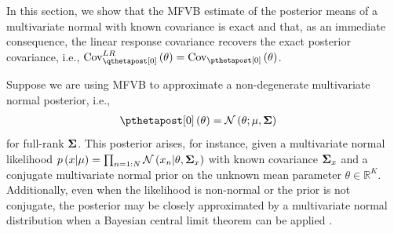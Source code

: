 \documentclass{article}\usepackage[]{graphicx}\usepackage[]{color}
\theoremstyle{definition}
\theoremstyle{plain}
\theoremstyle{plain}
\theoremstyle{plain}
\theoremstyle{definition}
\theoremstyle{plain}
\theoremstyle{plain}
\begin{document}
In this section, we show that the MFVB estimate of the posterior means
of a multivariate normal with known covariance is exact and that,
as an immediate consequence, the linear response covariance recovers
the exact posterior covariance, i.e., $\lrvbcov\left(\theta\right)=\pcov\left(\theta\right)$.

Suppose we are using MFVB to approximate a non-degenerate multivariate
normal posterior, i.e.,
\begin{align*}
\pzeropost\left(\theta\right) & =\mathcal{N}\left(\theta;\mu,\covmat\right)
\end{align*}
for full-rank $\boldsymbol{\Sigma}$. This posterior arises, for instance, given
a multivariate normal likelihood
$p\left(x\vert\mu\right)=\prod_{n=1:N}\mathcal{N}\left(x_{n}\vert\theta,\boldsymbol{\Sigma}_{x}\right)$
with known covariance $\boldsymbol{\Sigma}_{x}$ and a conjugate multivariate
normal prior on the unknown mean parameter $\theta\in\mathbb{R}^{K}$.
Additionally, even when the likelihood is non-normal or the prior
is not conjugate, the posterior may be closely approximated by a multivariate
normal distribution when a Bayesian central limit theorem can be applied
\citep[Chapter 8]{lecam:2012:asymptotics}.
\end{document}
